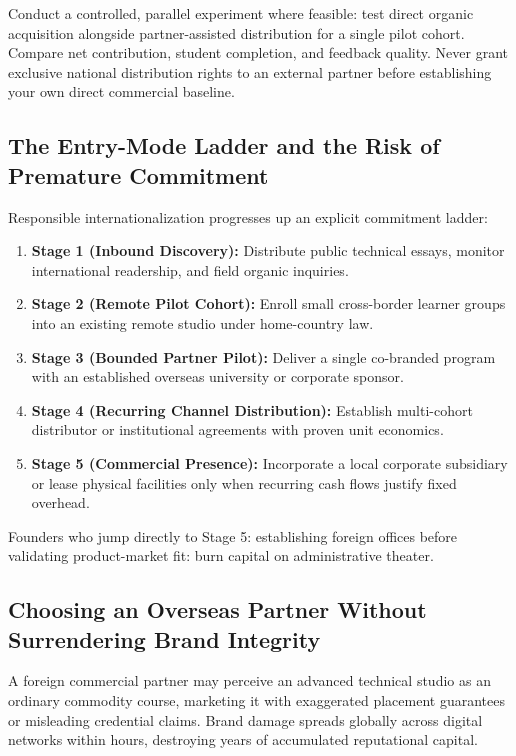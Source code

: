 Conduct a controlled, parallel experiment where feasible: test direct organic acquisition alongside partner-assisted distribution for a single pilot cohort. Compare net contribution, student completion, and feedback quality. Never grant exclusive national distribution rights to an external partner before establishing your own direct commercial baseline.

\subsection{The Entry-Mode Ladder and the Risk of Premature Commitment}
\label{sec:entry_mode_ladder_premature_commitment}

Responsible internationalization progresses up an explicit commitment ladder:
\begin{enumerate}
\item \textbf{Stage 1 (Inbound Discovery):} Distribute public technical essays, monitor international readership, and field organic inquiries.
\item \textbf{Stage 2 (Remote Pilot Cohort):} Enroll small cross-border learner groups into an existing remote studio under home-country law.
\item \textbf{Stage 3 (Bounded Partner Pilot):} Deliver a single co-branded program with an established overseas university or corporate sponsor.
\item \textbf{Stage 4 (Recurring Channel Distribution):} Establish multi-cohort distributor or institutional agreements with proven unit economics.
\item \textbf{Stage 5 (Commercial Presence):} Incorporate a local corporate subsidiary or lease physical facilities only when recurring cash flows justify fixed overhead.
\end{enumerate}
Founders who jump directly to Stage 5: establishing foreign offices before validating product-market fit: burn capital on administrative theater.

\subsection{Choosing an Overseas Partner Without Surrendering Brand Integrity}
\label{sec:overseas_partner_brand_integrity}

A foreign commercial partner may perceive an advanced technical studio as an ordinary commodity course, marketing it with exaggerated placement guarantees or misleading credential claims. Brand damage spreads globally across digital networks within hours, destroying years of accumulated reputational capital.

